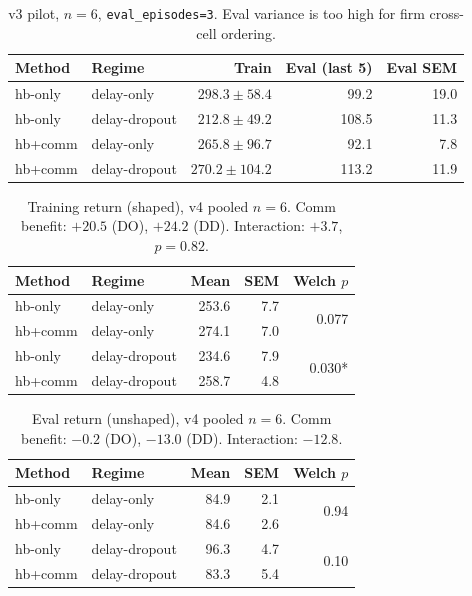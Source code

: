 \documentclass[conference,onecolumn]{IEEEtran}
\begin{document}
\begin{table}[!t]
\centering
\small
\caption{v3 pilot, $n{=}6$, \texttt{eval\_episodes=3}. Eval variance is too high for firm cross-cell ordering.}
\label{tab:v3}
\begin{tabular}{@{}llrrr@{}}
\toprule
\textbf{Method} & \textbf{Regime} & \textbf{Train} & \textbf{Eval (last 5)} & \textbf{Eval SEM} \\
\midrule
hb-only  & delay-only    & $298.3 \pm 58.4$ & 99.2  & 19.0 \\
hb-only  & delay-dropout & $212.8 \pm 49.2$ & 108.5 & 11.3 \\
hb+comm  & delay-only    & $265.8 \pm 96.7$ & 92.1  & 7.8  \\
hb+comm  & delay-dropout & $270.2 \pm 104.2$ & 113.2 & 11.9 \\
\bottomrule
\end{tabular}
\end{table}

\begin{table}[!t]
\centering
\small
\caption{Training return (shaped), v4 pooled $n{=}6$. Comm benefit: $+20.5$ (DO), $+24.2$ (DD). Interaction: $+3.7$, $p{=}0.82$.}
\label{tab:train}
\begin{tabular}{@{}llrrr@{}}
\toprule
\textbf{Method} & \textbf{Regime} & \textbf{Mean} & \textbf{SEM} & \textbf{Welch $p$} \\
\midrule
hb-only  & delay-only    & 253.6 & 7.7 & \multirow{2}{*}{0.077} \\
hb+comm  & delay-only    & 274.1 & 7.0 & \\
\midrule
hb-only  & delay-dropout & 234.6 & 7.9 & \multirow{2}{*}{0.030*} \\
hb+comm  & delay-dropout & 258.7 & 4.8 & \\
\bottomrule
\end{tabular}
\end{table}

\begin{table}[!t]
\centering
\small
\caption{Eval return (unshaped), v4 pooled $n{=}6$. Comm benefit: $-0.2$ (DO), $-13.0$ (DD). Interaction: $-12.8$.}
\label{tab:eval}
\begin{tabular}{@{}llrrr@{}}
\toprule
\textbf{Method} & \textbf{Regime} & \textbf{Mean} & \textbf{SEM} & \textbf{Welch $p$} \\
\midrule
hb-only  & delay-only    & 84.9 & 2.1 & \multirow{2}{*}{0.94} \\
hb+comm  & delay-only    & 84.6 & 2.6 & \\
\midrule
hb-only  & delay-dropout & 96.3 & 4.7 & \multirow{2}{*}{0.10} \\
hb+comm  & delay-dropout & 83.3 & 5.4 & \\
\bottomrule
\end{tabular}
\end{table}
\end{document}
